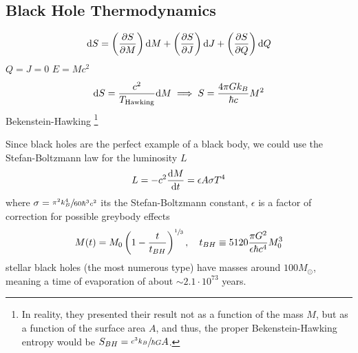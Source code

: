 \subsection{Black Hole Thermodynamics}
\begin{equation}
	\text{d} S=\left(\frac{\partial S}{\partial M}\right)\text{d} M+\left(\frac{\partial S}{\partial J}\right)\text{d} J+\left(\frac{\partial S}{\partial Q}\right)\text{d} Q
\end{equation}
$Q=J=0$ $E=Mc^2$
\begin{equation}
	\text{d} S=\frac{c^2}{T_{\text{Hawking}}}\text{d} M\implies S=\frac{4\pi Gk_B}{\hbar c}M^2
\end{equation}
Bekenstein-Hawking \footnote{In reality, they presented their result not as a function of the mass $M$, but as a function of the surface area $A$, and thus, the proper Bekenstein-Hawking entropy would be $S_{BH}=\sfrac{c^3k_B}{\hbar G}A$.}

Since black holes are the perfect example of a black body, we could use the Stefan-Boltzmann law for the luminosity $L$
\begin{equation}
	L=-c^2\frac{\text{d} M}{\text{d} t}=\epsilon A \sigma T^4
\end{equation}
where $\sigma=\sfrac{\pi^2 k_B^4}{60\hbar^3c^2}$ its the Stefan-Boltzmann constant, $\epsilon$ is a factor of correction for possible greybody effects
\begin{equation}
	M(t)=M_0\left(1-\frac{t}{t_{BH}}\right)^{\sfrac{1}{3}},\quad t_{BH}\equiv 5120\frac{\pi G^2}{\epsilon\hbar c^4}M_0^3
\end{equation}
stellar black holes (the most numerous type) have masses around $100M_\odot$, meaning a time of evaporation of about $\sim 2.1\cdot10^{73}$ years.
